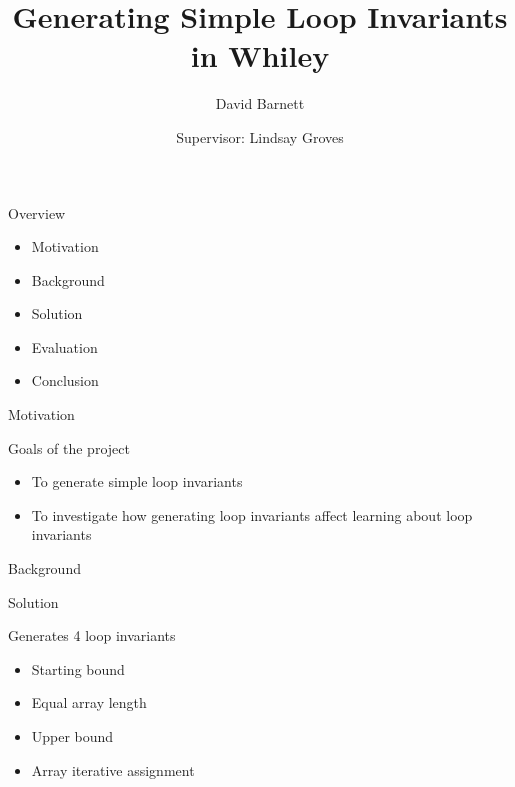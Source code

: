 

\title{Generating Simple Loop Invariants in Whiley}
\author{David Barnett}
\date{Supervisor: Lindsay Groves}


\frame{\titlepage}



\begin{frame}{Overview}

\begin{itemize}
\item Motivation
\item Background
\item Solution
\item Evaluation
\item Conclusion
\end{itemize}

\end{frame}



\begin{frame}{Motivation}

Goals of the project
\begin{itemize}
\item{To generate simple loop invariants}
\item{To investigate how generating loop invariants affect learning about loop
        invariants}
\end{itemize}

\end{frame}



\begin{frame}{Background}

\end{frame}



\begin{frame}{Solution}

Generates 4 loop invariants

\begin{itemize}
\item Starting bound
\item Equal array length
\item Upper bound
\item Array iterative assignment
\end{itemize}

\end{frame}



